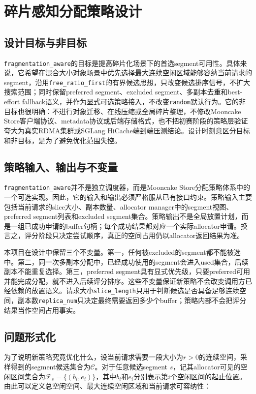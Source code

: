 \documentclass[UTF8,zihao=-4,a4paper]{ctexart}
\newcommand{\artifact}[1]{\texttt{#1}}
\newcommand{\strategy}{\texttt{fragmentation\_aware}}
\newcommand{\baseline}{\texttt{free\_ratio\_first}}
\begin{document}
\section{碎片感知分配策略设计}

\subsection{设计目标与非目标}

\strategy{}的目标是提高碎片化场景下的首选segment可用性。具体来说，它希望在混合大小对象场景中优先选择最大连续空闲区域能够容纳当前请求的segment，沿用\baseline{}的有界候选思想，只改变候选排序信号，不扩大搜索范围；同时保留preferred segment、excluded segment、多副本去重和best-effort fallback语义，并作为显式可选策略接入，不改变\artifact{random}默认行为。它的非目标也很明确：不进行对象迁移、在线压缩或全局碎片整理，不修改Mooncake Store客户端协议、metadata协议或后端存储格式，也不把初赛阶段的策略层验证夸大为真实RDMA集群或SGLang HiCache端到端压测结论。设计时刻意区分目标和非目标，是为了避免优化范围失控。

\subsection{策略输入、输出与不变量}

\strategy{}并不是独立调度器，而是Mooncake Store分配策略体系中的一个可选实现。因此，它的输入和输出必须严格服从已有接口约束。策略输入主要包括当前请求的slice大小、副本数量、allocator manager中的segment视图、preferred segment列表和excluded segment集合。策略输出不是全局放置计划，而是一组已成功申请的buffer句柄；每个成功结果都对应一个实际allocator申请。换言之，评分阶段只决定尝试顺序，真正的空间占用仍以allocator返回结果为准。

本项目在设计中保留三个不变量。第一，任何被excluded的segment都不能被选中。第二，同一次多副本分配中，已经成功使用的segment会进入used集合，后续副本不能重复选择。第三，preferred segment具有显式优先级，只要preferred可用并能完成分配，就不进入后续评分排序。这些不变量保证新策略不会改变调用方已经依赖的放置语义。请求大小\artifact{slice\_length}只用于判断候选是否具备足够连续空间，副本数\artifact{replica\_num}只决定最终需要返回多少个buffer；策略内部不会把评分结果当作空间占用事实。

\subsection{问题形式化}

为了说明新策略究竟优化什么，设当前请求需要一段大小为\(r>0\)的连续空间，采样得到的segment候选集合为\(\mathcal{C}\)。对于任意候选segment \(s\)，记其allocator可见的空闲区间集合为\(\mathcal{F}_s=\{(b_i,e_i)\}\)，其中\(b_i\)和\(e_i\)分别表示第\(i\)个空闲区间的起止位置。由此可以定义总空闲空间、最大连续空闲区域和当前请求可容纳性：
\end{document}
